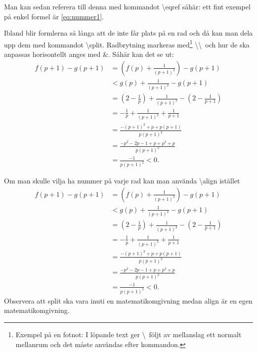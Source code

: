 \documentclass{article}
\begin{document}
Man kan sedan referera till denna med kommandot \textbackslash eqref såhär:
ett fint exempel på enkel formel är \eqref{eq:nummer1}.

Ibland blir formlerna så långa att de inte får plats på en rad och då kan
man dela upp dem med kommandot \textbackslash split. Radbrytning markeras 
med\footnote{Exempel på en fotnot: 
I löpande text ger \textbackslash\ följt av 
mellanslag ett normalt mellanrum och det måste användas efter kommandon.}
\textbackslash\textbackslash\ och hur de ska anpassas horisontellt anges med
\&. Såhär kan det se ut:
\begin{equation}
  \begin{split}
  f(p+1)-g(p+1) &= \left(f(p)+\frac1{(p+1)^2}\right)-g(p+1) \\
  &< g(p)+\frac1{(p+1)^2}-g(p+1) \\
  &= \left(2-\frac1p\right)+\frac1{(p+1)^2} -\left(2-\frac1{p+1}\right) \\
  &=-\frac1p+\frac1{(p+1)^2}+\frac1{p+1} \\
  &= \frac{-(p+1)^2+p+p(p+1)}{p(p+1)^2} \\
  &= \frac{-p^2-2p-1+p+p^2+p}{p(p+1)^2} \\
  &= \frac{-1}{p(p+1)^2}<0.    
  \end{split}
\end{equation}

Om man skulle vilja ha nummer på varje rad kan man använda \textbackslash align
istället
\begin{align}
  f(p+1)-g(p+1) &= \left(f(p)+\frac1{(p+1)^2}\right)-g(p+1) \\
  &< g(p)+\frac1{(p+1)^2}-g(p+1) \\
  &= \left(2-\frac1p\right)+\frac1{(p+1)^2} -\left(2-\frac1{p+1}\right) \\
  &=-\frac1p+\frac1{(p+1)^2}+\frac1{p+1} \\
  &= \frac{-(p+1)^2+p+p(p+1)}{p(p+1)^2} \\
  &= \frac{-p^2-2p-1+p+p^2+p}{p(p+1)^2} \\
  &= \frac{-1}{p(p+1)^2}<0.    
\end{align}
Observera att split ska vara inuti en matematikomgivning medan align är en 
egen matematikomgivning.


\tableofcontents
\end{document}
